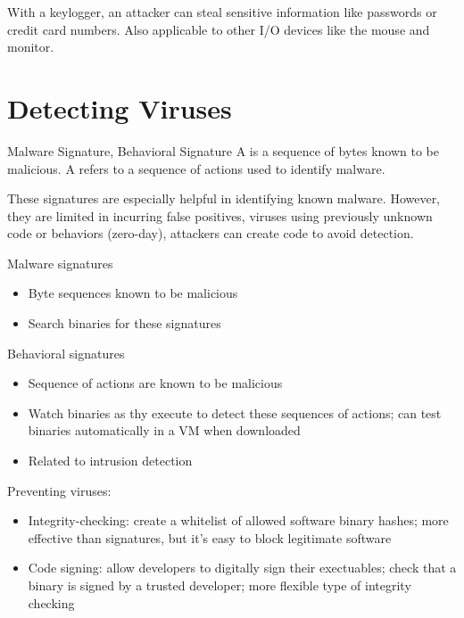 \documentclass[code]{amznotes}
\begin{document}
With a keylogger, an  attacker can steal sensitive information like passwords or credit card numbers. Also applicable to other I/O devices like the mouse and monitor.

\section{Detecting Viruses}

\begin{dfnbox}{Malware Signature, Behavioral Signature}{}
    A  is a sequence of bytes known to be malicious. A  refers to a sequence of actions used to identify malware.
\end{dfnbox}

These signatures are especially helpful in identifying known malware. However, they are limited in incurring false positives, viruses using previously unknown code or behaviors (zero-day), attackers can create code to avoid detection.

Malware signatures
\begin{itemize}
    \item Byte sequences known to be malicious
    \item Search binaries for these signatures
\end{itemize}

Behavioral signatures
\begin{itemize}
    \item Sequence of actions are known to be malicious
    \item Watch binaries as thy execute to detect these sequences of actions; can test binaries automatically in a VM when downloaded
    \item Related to intrusion detection
\end{itemize}



Preventing viruses:
\begin{itemize}
    \item Integrity-checking: create a whitelist of allowed software binary hashes; more effective than signatures, but it's easy to block legitimate software
    \item Code signing: allow developers to digitally sign their exectuables; check that a binary is signed by a trusted developer; more flexible type of integrity checking
\end{itemize}
\end{document}
